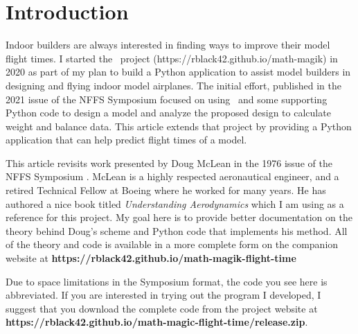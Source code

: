 \section{Introduction}


Indoor builders are always interested in finding ways to improve their model
flight times. I started the \MM\ project
(https://rblack42.github.io/math-magik) \cite{mmagik} in 2020 as part
of my plan to build a Python application to assist model builders in designing
and flying indoor model airplanes. The initial effort, published in the 2021
issue of the NFFS Symposium \cite{rblack} focused on using \osc\ and some
supporting Python code to design a model and analyze the proposed design to
calculate weight and balance data. This article extends that project by
providing a Python application that can help predict flight times of a model.

This article revisits work presented by Doug McLean in the 1976 issue of the
NFFS Symposium \cite{mclean}. McLean is a highly respected aeronautical engineer, and a
retired Technical Fellow at Boeing where he worked for many years. He has
authored a nice book titled {\it Understanding Aerodynamics} \cite{mclean13} which I am using as a reference for this project. My goal here is to
provide better documentation on the theory behind Doug's scheme and Python code
that implements his method. All of the theory and code is available in a more
complete form on the companion website at {\bf
https://rblack42.github.io/math-magik-flight-time} \cite{mmtime}

Due to space limitations in the Symposium format, the code you see here is
abbreviated. If you are interested in trying out the program I developed, I
suggest that you download the complete code from the project website at {\bf
https://rblack42.github.io/math-magic-flight-time/release.zip}.


